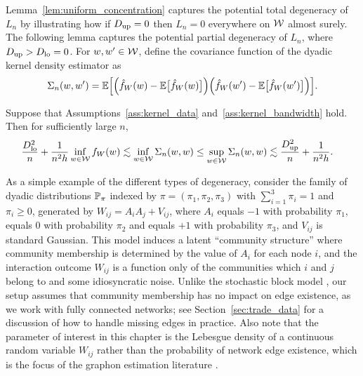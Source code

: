 Lemma~\ref{lem:uniform_concentration} captures the potential total degeneracy
of $L_n$ by illustrating how if $\Du=0$ then $L_n=0$ everywhere on $\cW$ almost
surely. The following lemma captures the potential partial degeneracy of $L_n$,
where $\Du > \Dl = 0$. For $w,w' \in \cW$, define the covariance function of
the dyadic kernel density estimator as
%
\begin{equation*}
  \Sigma_n(w,w') =
  \E\Big[
    \Big(
      \hat f_W(w)
      - \E\big[\hat f_W(w)\big]
    \Big)
    \Big(
      \hat f_W(w')
      - \E\big[\hat f_W(w')\big]
    \Big)
  \Big].
\end{equation*}
%
\begin{lemma}
  \label{lem:variance_bounds}
  Suppose that Assumptions~\ref{ass:kernel_data} and~\ref{ass:kernel_bandwidth}
  hold. Then for sufficiently large $n$,
  \begin{align*}
    \frac{\Dl^2}{n} + \frac{1}{n^2h}
    \inf_{w \in \cW} f_W(w)
    &\lesssim
    \inf_{w \in \cW} \Sigma_n(w,w)
    \leq
    \sup_{w \in \cW} \Sigma_n(w,w)
    \lesssim
    \frac{\Du^2}{n} + \frac{1}{n^2h}.
  \end{align*}
\end{lemma}

As a simple example of the different types of degeneracy, consider the family
of dyadic distributions $\P_{\pi}$ indexed by $\pi = (\pi_1, \pi_2, \pi_3)$
with $\sum_{i=1}^3 \pi_i = 1$ and $\pi_i \geq 0$, generated by
$W_{i j} = A_i A_j + V_{i j}$, where $A_i$ equals $-1$ with probability
$\pi_1$, equals $0$ with probability $\pi_2$ and equals $+1$ with probability
$\pi_3$, and $V_{i j}$ is standard Gaussian. This model induces a latent
``community structure'' where community membership is determined by the value
of $A_i$ for each node $i$, and the interaction outcome $W_{i j}$ is a function
only of the communities which $i$ and $j$ belong to and some idiosyncratic
noise. Unlike the stochastic block model \citep{kolaczyk2009statistical}, our
setup assumes that community membership has no impact on edge existence, as we
work with fully connected networks; see Section~\ref{sec:trade_data} for a
discussion of how to handle missing edges in practice. Also note that the
parameter of interest in this chapter is the Lebesgue density of a continuous
random variable $W_{i j}$ rather than the probability of network edge
existence, which is the focus of the graphon estimation literature
\citep{gao2021minimax}.

